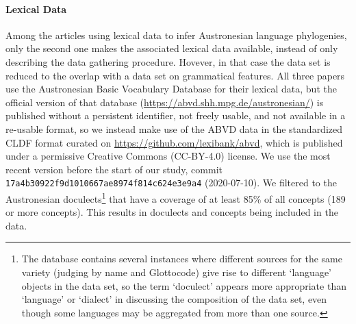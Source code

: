 \documentclass[]{rsos}%
\begin{document}
\paragraph{Lexical Data}
Among the articles using lexical data to infer Austronesian language phylogenies, only the second one
\parencite{greenhill2018population} makes the associated lexical data available, instead of only describing the data gathering procedure.
Hovever, in that case the data set is reduced to the overlap with a data set on grammatical features.
All three papers use the Austronesian Basic Vocabulary Database for their lexical data, but the official version of that database
(\url{https://abvd.shh.mpg.de/austronesian/}) is published without a persistent identifier, not freely usable, and not available in a re-usable format, so we instead make use of the ABVD
data in the standardized CLDF format \parencite{cldf} curated on \url{https://github.com/lexibank/abvd}, which is published under a
permissive Creative Commons (CC-BY-4.0) license. We use the most recent version before the start of our study, commit \texttt{17a4b30922f9d1010667ae8974f814c624e3e9a4}
(2020-07-10). We filtered to the Austronesian doculects\footnote{The database contains several instances where different
sources for the same variety (judging by name and Glottocode) give rise to different ‘language’ objects in the data set, so the term
‘doculect’ appears more appropriate than ‘language’ or ‘dialect’ in discussing the composition of the data set, even though some languages may be aggregated from more than one source.} that have a coverage
of at least 85\% of all concepts (189 or more concepts). This results in \countlects{} doculects and \countconcepts{} concepts being included in the data.
\end{document}
